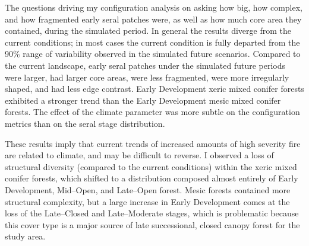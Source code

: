 The questions driving my configuration analysis on asking how big, how complex, and how fragmented early seral patches were, as well as how much core area they contained, during the simulated period. In general the results diverge from the current conditions; in most cases the current condition is fully departed from the 90\% range of variability observed in the simulated future scenarios. Compared to the current landscape, early seral patches under the simulated future periods were larger, had larger core areas, were less fragmented, were more irregularly shaped, and had less edge contrast. Early Development xeric mixed conifer forests exhibited a stronger trend than the Early Development mesic mixed conifer forests. The effect of the climate parameter was more subtle on the configuration metrics than on the seral stage distribution.

These results imply that current trends of increased amounts of high severity fire \citep{Miller2012,Mallek2013} are related to climate, and may be difficult to reverse. I observed a loss of structural diversity (compared to the current conditions) within the xeric mixed conifer forests, which shifted to a distribution composed almost entirely of Early Development, Mid--Open, and Late--Open forest. Mesic forests contained more structural complexity, but a large increase in Early Development comes at the loss of the Late--Closed and Late--Moderate stages, which is problematic because this cover type is a major source of late successional, closed canopy forest for the study area.




